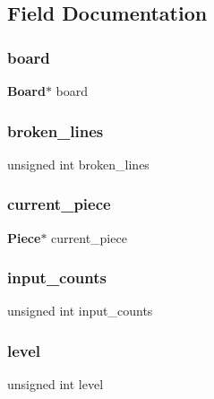 \subsection{Field Documentation}
\mbox{\label{structState_ab8dad7d3cb14e06a506084453a9cf527}} 
\subsubsection{board}
{\footnotesize\ttfamily \textbf{ Board}$\ast$ board}

\mbox{\label{structState_a67fc108b56c9238ce197b470af1f1727}} 
\subsubsection{broken\+\_\+lines}
{\footnotesize\ttfamily unsigned int broken\+\_\+lines}

\mbox{\label{structState_a720152f0ad7b57a077424a1a48efcf7e}} 
\subsubsection{current\+\_\+piece}
{\footnotesize\ttfamily \textbf{ Piece}$\ast$ current\+\_\+piece}

\mbox{\label{structState_a0d74c170ea3f963a63b02b037e0edc6c}} 
\subsubsection{input\+\_\+counts}
{\footnotesize\ttfamily unsigned int input\+\_\+counts}

\mbox{\label{structState_a9082f945c1d289684d0bcd51ee08e11e}} 
\subsubsection{level}
{\footnotesize\ttfamily unsigned int level}

\mbox{\label{structState_a0be8ae11bca3b397007b6be567b13711}} 
